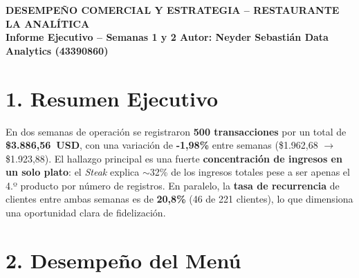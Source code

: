 \documentclass[10pt,letterpaper]{article}
\begin{document}
\begin{tcolorbox}[
    colback=brand,colframe=brand,arc=1pt,
    left=8pt,right=8pt,top=6pt,bottom=6pt,boxsep=0pt]
  \color{white}\bfseries\large
  DESEMPEÑO COMERCIAL Y ESTRATEGIA -- RESTAURANTE LA ANALÍTICA\\
  \color{white!85}\normalfont\small
  Informe Ejecutivo -- Semanas 1 y 2 \hfill Autor: Neyder Sebastián \hfill Data Analytics (43390860)
\end{tcolorbox}

\vspace{2pt}

\section{1. Resumen Ejecutivo}

\begin{tcolorbox}[colback=brandsoft,colframe=brand!30,arc=1pt,
    left=6pt,right=6pt,top=4pt,bottom=4pt,boxsep=0pt]
\small
En dos semanas de operación se registraron \textbf{500 transacciones} por un total de
\textbf{\$3.886,56~USD}, con una variación de \textbf{-1,98\%} entre semanas
(\$1.962,68 $\rightarrow$ \$1.923,88). El hallazgo principal es una fuerte
\textbf{concentración de ingresos en un solo plato}: el \emph{Steak} explica $\sim$32\%
de los ingresos totales pese a ser apenas el 4.º producto por número de registros.
En paralelo, la \textbf{tasa de recurrencia} de clientes entre ambas semanas es de
\textbf{20,8\%} (46 de 221 clientes), lo que dimensiona una oportunidad clara de
fidelización.
\end{tcolorbox}

\section{2. Desempeño del Menú}
\end{document}
